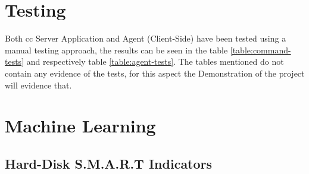 \section{Testing}

Both \acrfull{cc} Server Application and Agent (Client-Side) have been tested using a manual testing approach, the
results can be seen in the table \ref{table:command-tests} and respectively table \ref{table:agent-tests}. The tables
mentioned do not contain any evidence of the tests, for this aspect the Demonstration of the project will evidence that.

\newpage

\section{Machine Learning}

\subsection{Hard-Disk S.M.A.R.T Indicators}

